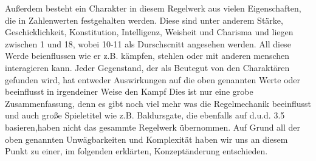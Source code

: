 Außerdem besteht ein Charakter in diesem Regelwerk aus vielen Eigenschaften, die in Zahlenwerten festgehalten werden. Diese sind unter anderem Stärke, Geschicklichkeit, Konstitution, Intelligenz, Weisheit und Charisma und liegen zwischen 1 und 18, wobei 10-11 als Durschscnitt angesehen werden. All diese Werde beienflussen wie er z.B. kämpfen, stehlen oder mit anderen menschen interagieren kann. Jeder Gegenstand, der als Beutegut von den Charaktären gefunden wird, hat entweder Auswirkungen auf die oben genannten Werte oder beeinflusst in irgendeiner Weise den Kampf Dies ist nur eine grobe Zusammenfassung, denn es gibt noch viel mehr was die Regelmechanik beeinflusst und auch große Spieletitel wie z.B. Baldursgate, die ebenfalls auf d.u.d. 3.5 basieren,haben nicht das gesammte Regelwerk übernommen. 
Auf Grund all der oben genannten Unwägbarkeiten und Komplexität haben wir uns an diesem Punkt zu einer, im folgenden erklärten, Konzeptänderung entschieden. 
